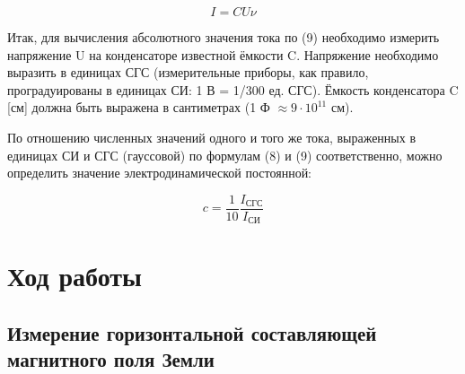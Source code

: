 \documentclass[a4paper,12pt]{article} %
\begin{document}
\begin{equation}
  I = CU\nu
\end{equation}


Итак, для вычисления абсолютного значения тока по (9) необходимо измерить напряжение U на конденсаторе известной ёмкости C. Напряжение необходимо выразить в единицах СГС (измерительные приборы, как правило, проградуированы в единицах СИ: 1 В = 1/300 ед. СГС).
Ёмкость конденсатора C [см] должна быть выражена в сантиметрах (1 Ф $\approx 9\cdot 10^{11}$ см).

По отношению численных значений одного и того же тока, выраженных в единицах СИ и СГС (гауссовой) по формулам (8) и (9) соответственно, можно определить значение электродинамической постоянной:

\begin{equation}
  c  = \frac{1}{10} \frac{I_{СГС}}{I_{СИ}}
\end{equation}


\section{Ход работы}

\subsection{Измерение горизонтальной составляющей магнитного поля Земли}
\end{document}
